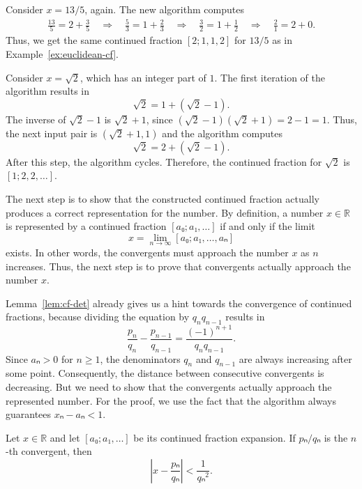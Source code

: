 \begin{example}
  \label{ex:cf-rat}
  Consider $x = 13/5$, again.
  The new algorithm computes
  \begin{align*}
    \frac{13}{5} = 2 + \frac{3}{5}
    \quad \Rightarrow \quad
    \frac{5}{3} = 1 + \frac{2}{3}
    \quad \Rightarrow \quad
    \frac{3}{2} = 1 + \frac{1}{2}
    \quad \Rightarrow \quad
    \frac{2}{1} = 2 + 0.
  \end{align*}
  Thus, we get the same continued fraction $[2; 1, 1, 2]$ for $13/5$
  as in Example~\ref{ex:euclidean-cf}.
\end{example}

\begin{example}
  \label{ex:cf-irrat}
  Consider $x = \sqrt{2}$, which has an integer part of $1$.
  The first iteration of the algorithm results in
  \[
    \sqrt{2} = 1 + (\sqrt{2} - 1).
  \]
  The inverse of $\sqrt{2} - 1$ is $\sqrt{2} + 1$,
  since $(\sqrt{2} - 1)(\sqrt{2} + 1) = 2 - 1 = 1$.
  Thus, the next input pair is $(\sqrt{2} + 1, 1)$ and the algorithm computes
  \[
    \sqrt{2} = 2 + (\sqrt{2} - 1).
  \]
  After this step,
  the algorithm cycles.
  Therefore, the continued fraction for $\sqrt{2}$ is $[1; 2, 2, …]$.
\end{example}

The next step is to show that the constructed continued fraction actually
produces a correct representation for the number.
By definition, a number $x ∈ ℝ$ is represented by a continued fraction $[a₀;
a₁, …]$ if and only if the limit
\[
  x = \lim_{n → ∞} [a₀; a₁, …, aₙ]
\]
exists.
In other words, the convergents must approach the number $x$ as $n$ increases.
Thus, the next step is to prove that convergents actually approach the number $x$.

Lemma~\ref{lem:cf-det} already gives us a hint towards the convergence of
continued fractions, because dividing the equation by $q_n q_{n-1}$ results in
\[
  \frac{p_n}{q_n} - \frac{p_{n-1}}{q_{n-1}} = \frac{(-1)^{n+1}}{q_n q_{n-1}}.
\]
Since $aₙ > 0$ for $n ≥ 1$, the denominators $q_n$ and $q_{n-1}$ are always
increasing after some point.
Consequently, the distance between consecutive convergents is decreasing.
But we need to show that the convergents actually approach the represented number.
For the proof, we use the fact that the algorithm always guarantees $xₙ - aₙ < 1$.

\begin{lemma}
  \label{lem:cf-approx}
  Let $x ∈ ℝ$ and let $[a₀; a₁, …]$ be its continued fraction expansion.
  If $pₙ/qₙ$ is the $n$-th convergent, then
  \[
    \left| x - \frac{pₙ}{qₙ} \right| < \frac{1}{qₙ^2}.
  \]
\end{lemma}

